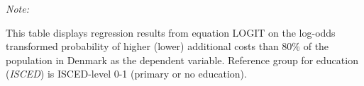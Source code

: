 \begin{table}[htbp!]
\begin{adjustbox}{width = 1\textwidth, max height = 0.95\textheight, center}
\begin{threeparttable}[b]
         \begin{tablenotes}\item \medskip \textit{Note:}
            \item This table displays regression results from equation LOGIT on the log-odds transformed probability of higher (lower) additional costs than 80\% of the population in Denmark as the dependent variable. Reference group for education (\textit{ISCED}) is ISCED-level 0-1 (primary or no education).
         \end{tablenotes}
      \end{threeparttable}
   \end{adjustbox}
\end{table}


